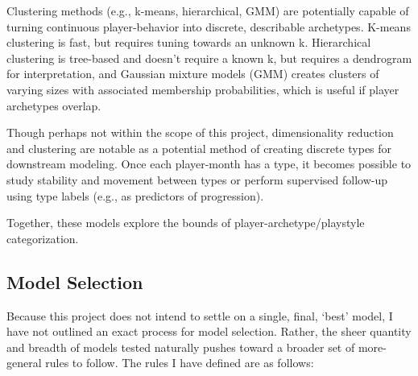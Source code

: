 \documentclass[
  12pt]{article}
\begin{document}
Clustering methods (e.g., k-means, hierarchical, GMM) are potentially
capable of turning continuous player-behavior into discrete, describable
archetypes. K-means clustering is fast, but requires tuning towards an
unknown k. Hierarchical clustering is tree-based and doesn't require a
known k, but requires a dendrogram for interpretation, and Gaussian
mixture models (GMM) creates clusters of varying sizes with associated
membership probabilities, which is useful if player archetypes overlap.

Though perhaps not within the scope of this project, dimensionality
reduction and clustering are notable as a potential method of creating
discrete types for downstream modeling. Once each player-month has a
type, it becomes possible to study stability and movement between types
or perform supervised follow-up using type labels (e.g., as predictors
of progression).

Together, these models explore the bounds of player-archetype/playstyle
categorization.

\subsection{Model Selection}\label{model-selection}

Because this project does not intend to settle on a single, final,
`best' model, I have not outlined an exact process for model selection.
Rather, the sheer quantity and breadth of models tested naturally pushes
toward a broader set of more-general rules to follow. The rules I have
defined are as follows:
\end{document}
